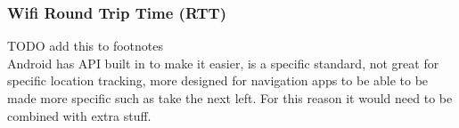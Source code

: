 \subsubsection{Wifi Round Trip Time (RTT)}

TODO add this to footnotes\\
Android has API built in to make it easier, is a specific  standard, not great for specific location tracking, more designed for navigation apps to be able to be made more specific such as take the next left. For this reason it would need to be combined with extra stuff.

